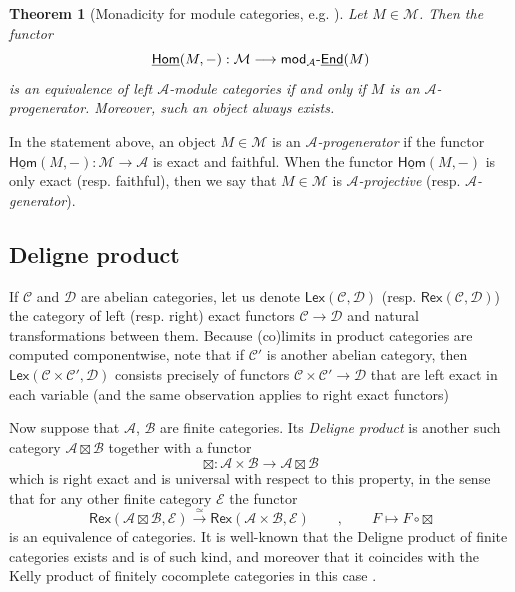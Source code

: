\documentclass[11pt]{article}
\newtheorem{theorem}{Theorem}[section]
\theoremstyle{definition}
\begin{document}
\begin{theorem}[Monadicity for module categories, e.g. {\cite[\S 7.10]{egno}}]\label{thm:monadicity_thm}
Let $M \in \mathcal{M}$. Then the functor $$\underline{\mathsf{Hom}}(M,-): \mathcal{M} \longrightarrow  \mathsf{mod}_\mathcal{A}{\text -}\underline{\mathsf{End}}(M)  $$ is an equivalence of left $\mathcal{A}$-module categories if and only if $M$ is an $\mathcal{A}$-progenerator. Moreover, such an object always exists.
\end{theorem}

In the statement above, an object $M \in \mathcal{M}$ is an \emph{$\mathcal{A}$-progenerator} if the functor $\underline{\mathsf{Hom}}(M,-): \mathcal{M} \longrightarrow \mathcal{A}$ is exact and faithful. When the functor $\underline{\mathsf{Hom}}(M,-)$ is only exact (resp. faithful), then we say that $M \in \mathcal{M}$ is \emph{$\mathcal{A}$-projective} (resp. \emph{$\mathcal{A}$-generator}).


\subsection{Deligne product}

If $\mathcal{C}$ and $\mathcal{D}$ are abelian categories, let us denote $\mathsf{Lex}(\mathcal{C}, \mathcal{D})$ (resp. $\mathsf{Rex} (\mathcal{C}, \mathcal{D})$) the category of left (resp. right) exact functors $\mathcal{C} \longrightarrow \mathcal{D}$ and natural transformations between them. Because (co)limits in product categories are computed  componentwise, note that if $\mathcal{C}'$ is another abelian category, then $\mathsf{Lex}(\mathcal{C} \times \mathcal{C}', \mathcal{D})$ consists precisely of functors $\mathcal{C} \times \mathcal{C}' \longrightarrow \mathcal{D}$ that are left exact in each variable (and the same observation applies to right exact functors)

Now suppose that  $\mathcal{A}$, $\mathcal{B}$ are finite categories. Its \emph{Deligne product} \cite[\S 5]{deligne} is another such category $\mathcal{A} \boxtimes \mathcal{B}$ together with a functor 
\begin{equation}\label{eq:Deligne_product_functor}
\boxtimes : \mathcal{A} \times \mathcal{B} \longrightarrow \mathcal{A} \boxtimes \mathcal{B}
\end{equation}
which is right exact and is universal with respect to this property, in the sense that for any other finite category $\mathcal{E}$ the functor
$$ \mathsf{Rex}(\mathcal{A} \boxtimes \mathcal{B}, \mathcal{E}) \overset{\simeq}{\longrightarrow } \mathsf{Rex} (\mathcal{A} \times \mathcal{B}, \mathcal{E}) \qquad , \qquad F \longmapsto F \circ \boxtimes  $$
is an equivalence of categories. It is well-known that the Deligne product of finite categories exists and is of such kind, and moreover that it coincides with the Kelly product of finitely cocomplete categories in this case \cite{Franco2013}.
\end{document}
